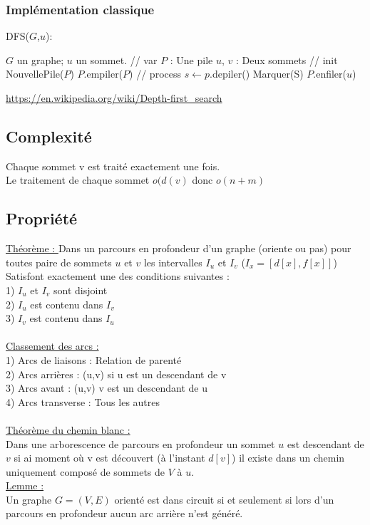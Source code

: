 \documentclass{article}
\begin{document}
\subsubsection{Implémentation classique}
\begin{algorithm}
\caption{DFS($G$,$u$):}
\begin{algorithmic}
\REQUIRE $G$ un graphe; $u$ un sommet. 
\STATE // var
\STATE $P$ : Une pile
\STATE $u$, $v$ : Deux sommets 
\STATE // init 
\STATE NouvellePile($P$)
\STATE $P$.empiler($P$)
\STATE // process
\STATE $s \leftarrow p$.depiler()
\STATE Marquer(S)
\STATE $P$.enfiler($u$)
\ENDFOR
\ENDIF
\ENDWHILE
\end{algorithmic}
\end{algorithm}
\url{https://en.wikipedia.org/wiki/Depth-first_search}
\subsection{Complexité}
Chaque sommet v est traité exactement une fois. \\
Le traitement de chaque sommet $o(d(v)$ donc $o(n+m)$
\subsection{Propriété}
\underline{Théorème : }
 Dans un parcours en profondeur d’un graphe (oriente ou pas) pour toutes paire de sommets $u$ et $v$ les intervalles $I_u$ et $I_v$ ($I_x=[d[x],f[x]]$) \\
 Satisfont exactement une des conditions suivantes : \\
1) $I_u$ et $I_v$ sont disjoint \\
2) $I_u$ est contenu dans $I_v$ \\
3) $I_v$ est contenu dans $I_u$ \\
 \\
 \underline {Classement des arcs : } \\
1) Arcs de liaisons : Relation de parenté \\
2) Arcs arrières : (u,v) si u est un descendant de v \\
3) Arcs avant : (u,v) v est un descendant de u \\
4) Arcs transverse : Tous les autres \\
\\
\underline{ Théorème du chemin blanc : } \\
Dans une arborescence de parcours en profondeur un sommet $u$ est descendant de $v$ si ai moment où v est découvert (à l’instant $d[v]$) il existe dans un chemin uniquement composé de sommets de $V$ à $u$. \\
\newpage
\underline{Lemme : } \\
Un graphe $G=(V,E)$ orienté est dans circuit si et seulement si lors d’un parcours en profondeur aucun arc arrière n’est généré. \\
\end{document}
